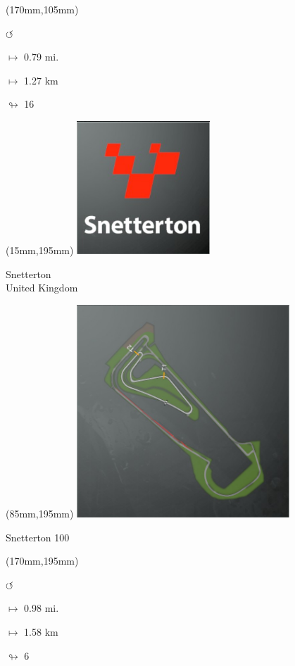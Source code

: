 \begin{textblock*}{30mm}(170mm,105mm)%
\par \Huge$\circlearrowleft$
\Large
\par$\mapsto$ 0.79 mi.
\par$\mapsto$ 1.27 km
\par$\looparrowright$ 16
\end{textblock*}
\begin{textblock*}{60mm}(15mm,195mm)%
\includegraphics[width=50mm]{LG/2015-05-20_00095.png}
\par Snetterton\\ United Kingdom
\end{textblock*}
\begin{textblock*}{80mm}(85mm,195mm)%
\includegraphics[width=80mm]{TR/2015-05-20_00062.png}
\centerline{Snetterton 100}
\end{textblock*}
\begin{textblock*}{30mm}(170mm,195mm)%
\par \Huge$\circlearrowleft$
\Large
\par$\mapsto$ 0.98 mi.
\par$\mapsto$ 1.58 km
\par$\looparrowright$ 6
\end{textblock*}
\null\newpage

